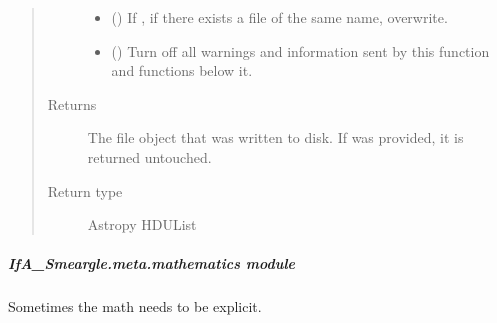 \documentclass[letterpaper,10pt,english]{sphinxmanual}
\begin{document}
\begin{fulllineitems}
\begin{quote}
\begin{description}
\begin{itemize}
\item {} 
 (\sphinxstyleliteralemphasis{\sphinxupquote{ (}}\sphinxstyleliteralemphasis{\sphinxupquote{)}}) \textendash{} If , if there exists a file of the same name, overwrite.

\item {} 
 (\sphinxstyleliteralemphasis{\sphinxupquote{ (}}\sphinxstyleliteralemphasis{\sphinxupquote{)}}) \textendash{} Turn off all warnings and information sent by this function and
functions below it.

\end{itemize}

\item[{Returns}] \leavevmode
{} \textendash{} The file object that was written to disk. If  was
provided, it is returned untouched.

\item[{Return type}] \leavevmode
Astropy HDUList

\end{description}\end{quote}

\end{fulllineitems}



\subparagraph{IfA\_Smeargle.meta.mathematics module}
\label{\detokenize{python_docstrings/IfA_Smeargle.meta.mathematics:module-IfA_Smeargle.meta.mathematics}}\label{\detokenize{python_docstrings/IfA_Smeargle.meta.mathematics:ifa-smeargle-meta-mathematics-module}}\label{\detokenize{python_docstrings/IfA_Smeargle.meta.mathematics::doc}}
Sometimes the math needs to be explicit.
\end{document}

